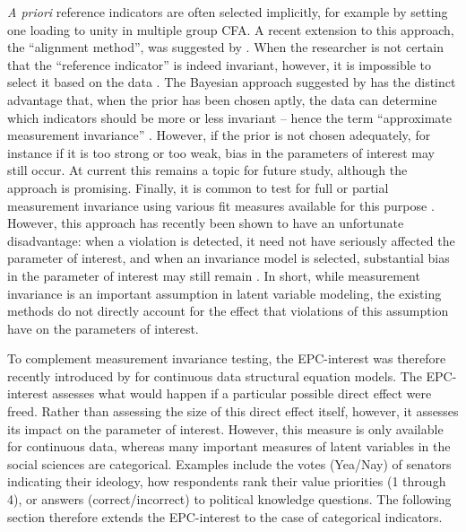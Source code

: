 \documentclass[letterpaper,12pt]{article}
\begin{document}
\emph{A priori} reference indicators are often selected implicitly, for example by setting one loading to unity in multiple group CFA. A recent extension to this approach, the ``alignment method'', was suggested by \citet{muthen2014alignment}. When the researcher is not certain that the ``reference indicator'' is indeed invariant, however, it is impossible to select it based on the data \citep{hancock2009tenuousness}. The Bayesian approach suggested by \citet{muthen2012bayesian} has the distinct advantage that, when the prior has been chosen aptly, the data can determine which indicators should be more or less invariant -- hence the term ``approximate measurement invariance'' \citep[see also][]{schoot2013facing}. However, if the prior is not chosen adequately, for instance if it is too strong or too weak, bias in the parameters of interest may still occur. At current this remains a topic for future study, although the approach is promising. Finally, it is common to test for full or partial measurement invariance using various fit measures available for this purpose \citep{byrne1989testing,hu1998fit,cheung2002evaluating,chen2007sensitivity,saris2009testing}. However, this approach has recently been shown to have an unfortunate disadvantage: when a violation is detected, it need not have seriously affected the parameter of interest, and when an invariance model is selected, substantial bias in the parameter of interest may still remain \citep{Oberski:WP:EPC-interest}. In short, while measurement invariance is an important assumption in latent variable modeling, the existing methods do not directly account for the effect that violations of this assumption have on the parameters of interest.

To complement measurement invariance testing, the 
 EPC-interest was therefore recently introduced by \citet{Oberski:WP:EPC-interest} for continuous data structural equation models. The EPC-interest assesses what would happen if a particular possible direct effect were freed. Rather than assessing the size of this direct effect itself, however, it assesses its impact on the parameter of interest. However, this measure is only available for continuous data, whereas many important measures of latent variables in the social sciences are categorical. Examples include the votes (Yea/Nay) of senators indicating their ideology, how respondents rank their value priorities (1 through 4), or answers (correct/incorrect) to political knowledge questions. The following section therefore extends the EPC-interest to the case of categorical indicators.
\end{document}
